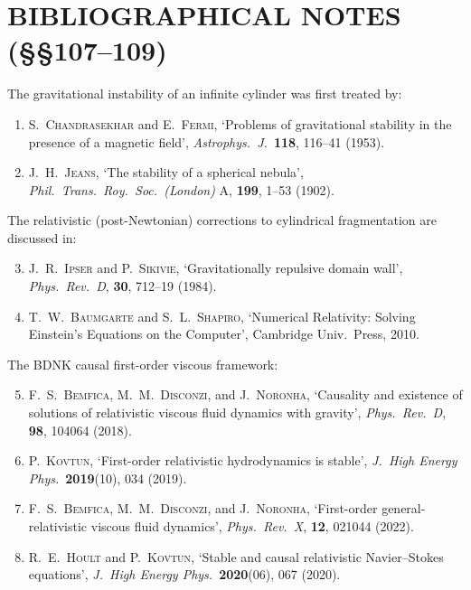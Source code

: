 \section*{BIBLIOGRAPHICAL NOTES ({\S\S}107--109)}
\label{sec:rel-12-107-109-bib}

The gravitational instability of an infinite cylinder was first treated by:
\begin{enumerate}
\item S.~\textsc{Chandrasekhar} and E.~\textsc{Fermi}, `Problems of
  gravitational stability in the presence of a magnetic field',
  \emph{Astrophys.\ J.}\ \textbf{118}, 116--41 (1953).

\item J.~H.~\textsc{Jeans}, `The stability of a spherical nebula',
  \emph{Phil.\ Trans.\ Roy.\ Soc.\ (London)} A, \textbf{199}, 1--53
  (1902).
\end{enumerate}

\noindent
The relativistic (post-Newtonian) corrections to cylindrical
fragmentation are discussed in:
\begin{enumerate}
\setcounter{enumi}{2}
\item J.~R.~\textsc{Ipser} and P.~\textsc{Sikivie}, `Gravitationally
  repulsive domain wall', \emph{Phys.\ Rev.\ D}, \textbf{30}, 712--19
  (1984).

\item T.~W.~\textsc{Baumgarte} and S.~L.~\textsc{Shapiro},
  `Numerical Relativity: Solving Einstein's Equations on the Computer',
  Cambridge Univ.\ Press, 2010.
\end{enumerate}

\noindent
The BDNK causal first-order viscous framework:
\begin{enumerate}
\setcounter{enumi}{4}
\item F.~S.~\textsc{Bemfica}, M.~M.~\textsc{Disconzi}, and
  J.~\textsc{Noronha}, `Causality and existence of solutions of
  relativistic viscous fluid dynamics with gravity',
  \emph{Phys.\ Rev.\ D}, \textbf{98}, 104064 (2018).

\item P.~\textsc{Kovtun}, `First-order relativistic hydrodynamics is
  stable', \emph{J.\ High Energy Phys.}\ \textbf{2019}(10), 034 (2019).

\item F.~S.~\textsc{Bemfica}, M.~M.~\textsc{Disconzi}, and
  J.~\textsc{Noronha}, `First-order general-relativistic viscous fluid
  dynamics', \emph{Phys.\ Rev.\ X}, \textbf{12}, 021044 (2022).

\item R.~E.~\textsc{Hoult} and P.~\textsc{Kovtun}, `Stable and causal
  relativistic Navier--Stokes equations', \emph{J.\ High Energy Phys.}\
  \textbf{2020}(06), 067 (2020).
\end{enumerate}

